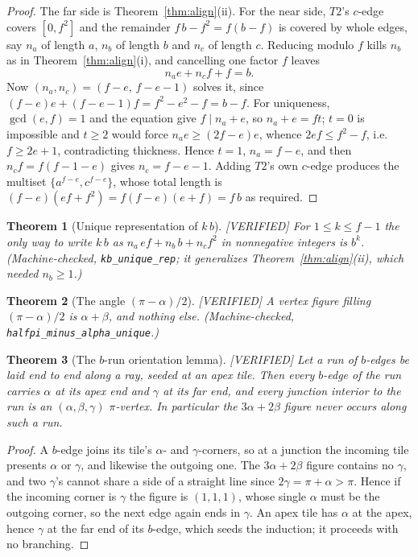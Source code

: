 \documentclass[11pt,reqno]{amsart}
\theoremstyle{plain}
\newtheorem{theorem}{Theorem}
\theoremstyle{definition}
\newcommand{\lab}[1]{\hfill\textnormal{\footnotesize\textsc{[#1]}}}
\begin{document}
\begin{proof}
The far side is Theorem~\ref{thm:align}(ii). For the near side, $T2$'s $c$-edge covers $[0,f^2]$ and
the remainder $f\,b-f^2=f(b-f)$ is covered by whole edges, say $n_a$ of length $a$, $n_b$ of length
$b$ and $n_c$ of length $c$. Reducing modulo $f$ kills $n_b$ as in Theorem~\ref{thm:align}(i), and
cancelling one factor $f$ leaves
\[
n_a e+n_c f+f=b .
\]
Now $(n_a,n_c)=(f-e,\,f-e-1)$ solves it, since $(f-e)e+(f-e-1)f=f^2-e^2-f=b-f$. For uniqueness,
$\gcd(e,f)=1$ and the equation give $f\mid n_a+e$, so $n_a+e=ft$; $t=0$ is impossible and $t\ge2$
would force $n_ae\ge(2f-e)e$, whence $2ef\le f^2-f$, i.e. $f\ge2e+1$, contradicting thickness. Hence
$t=1$, $n_a=f-e$, and then $n_cf=f(f-1-e)$ gives $n_c=f-e-1$. Adding $T2$'s own $c$-edge produces the
multiset $\{a^{f-e},c^{f-e}\}$, whose total length is $(f-e)(ef+f^2)=f(f-e)(e+f)=f\,b$ as required.
\end{proof}

\begin{theorem}[Unique representation of $k\,b$]\label{thm:kbrep}\lab{VERIFIED}
For $1\le k\le f-1$ the only way to write $k\,b$ as $n_a\,ef+n_b\,b+n_c f^2$ in nonnegative integers
is $b^{k}$. \textup{(}Machine-checked, \texttt{kb\_unique\_rep}; it generalizes
Theorem~\ref{thm:align}\textup{(ii)}, which needed $n_b\ge1$.\textup{)}
\end{theorem}

\begin{theorem}[The angle $(\pi-\alpha)/2$]\label{thm:halfangle}\lab{VERIFIED}
A vertex figure filling $(\pi-\alpha)/2$ is $\alpha+\beta$, and nothing else.
\textup{(}Machine-checked, \texttt{halfpi\_minus\_alpha\_unique}.\textup{)}
\end{theorem}

\begin{theorem}[The $b$-run orientation lemma]\label{thm:chain}\lab{VERIFIED}
Let a run of $b$-edges be laid end to end along a ray, seeded at an apex tile. Then every $b$-edge of
the run carries $\alpha$ at its apex end and $\gamma$ at its far end, and every junction interior to
the run is an $(\alpha,\beta,\gamma)$ $\pi$-vertex. In particular the $3\alpha+2\beta$ figure never
occurs along such a run.
\end{theorem}

\begin{proof}
A $b$-edge joins its tile's $\alpha$- and $\gamma$-corners, so at a junction the incoming tile
presents $\alpha$ or $\gamma$, and likewise the outgoing one. The $3\alpha+2\beta$ figure contains no
$\gamma$, and two $\gamma$'s cannot share a side of a straight line since $2\gamma=\pi+\alpha>\pi$.
Hence if the incoming corner is $\gamma$ the figure is $(1,1,1)$, whose single $\alpha$ must be the
outgoing corner, so the next edge again ends in $\gamma$. An apex tile has $\alpha$ at the apex, hence
$\gamma$ at the far end of its $b$-edge, which seeds the induction; it proceeds with no branching.
\end{proof}
\end{document}
